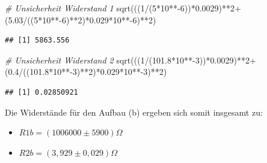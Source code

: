 \documentclass[
  9pt,
]{article}
\newenvironment{Shaded}{\begin{snugshade}}{\end{snugshade}}
\newcommand{\CommentTok}[1]{\textcolor[rgb]{0.56,0.35,0.01}{\textit{#1}}}
\newcommand{\DecValTok}[1]{\textcolor[rgb]{0.00,0.00,0.81}{#1}}
\newcommand{\FloatTok}[1]{\textcolor[rgb]{0.00,0.00,0.81}{#1}}
\newcommand{\FunctionTok}[1]{\textcolor[rgb]{0.00,0.00,0.00}{#1}}
\newcommand{\NormalTok}[1]{#1}
\newcommand{\SpecialCharTok}[1]{\textcolor[rgb]{0.00,0.00,0.00}{#1}}
\begin{document}
\begin{Shaded}
\begin{Highlighting}[]
\CommentTok{\# Unsicherheit Widerstand 1}
\FunctionTok{sqrt}\NormalTok{(((}\DecValTok{1}\SpecialCharTok{/}\NormalTok{(}\DecValTok{5}\SpecialCharTok{*}\DecValTok{10}\SpecialCharTok{**{-}}\DecValTok{6}\NormalTok{))}\SpecialCharTok{*}\FloatTok{0.0029}\NormalTok{)}\SpecialCharTok{**}\DecValTok{2}\SpecialCharTok{+}\NormalTok{(}\FloatTok{5.03}\SpecialCharTok{/}\NormalTok{((}\DecValTok{5}\SpecialCharTok{*}\DecValTok{10}\SpecialCharTok{**{-}}\DecValTok{6}\NormalTok{)}\SpecialCharTok{**}\DecValTok{2}\NormalTok{)}\SpecialCharTok{*}\FloatTok{0.029}\SpecialCharTok{*}\DecValTok{10}\SpecialCharTok{**{-}}\DecValTok{6}\NormalTok{)}\SpecialCharTok{**}\DecValTok{2}\NormalTok{)}
\end{Highlighting}
\end{Shaded}

\begin{verbatim}
## [1] 5863.556
\end{verbatim}

\begin{Shaded}
\begin{Highlighting}[]
\CommentTok{\# Unsicherheit Widerstand 2}
\FunctionTok{sqrt}\NormalTok{(((}\DecValTok{1}\SpecialCharTok{/}\NormalTok{(}\FloatTok{101.8}\SpecialCharTok{*}\DecValTok{10}\SpecialCharTok{**{-}}\DecValTok{3}\NormalTok{))}\SpecialCharTok{*}\FloatTok{0.0029}\NormalTok{)}\SpecialCharTok{**}\DecValTok{2}\SpecialCharTok{+}\NormalTok{(}\FloatTok{0.4}\SpecialCharTok{/}\NormalTok{((}\FloatTok{101.8}\SpecialCharTok{*}\DecValTok{10}\SpecialCharTok{**{-}}\DecValTok{3}\NormalTok{)}\SpecialCharTok{**}\DecValTok{2}\NormalTok{)}\SpecialCharTok{*}\FloatTok{0.029}\SpecialCharTok{*}\DecValTok{10}\SpecialCharTok{**{-}}\DecValTok{3}\NormalTok{)}\SpecialCharTok{**}\DecValTok{2}\NormalTok{)}
\end{Highlighting}
\end{Shaded}

\begin{verbatim}
## [1] 0.02850921
\end{verbatim}

Die Widerstände für den Aufbau (b) ergeben sich somit insgesamt zu:

\begin{itemize}
\item $R1b = (1006000\pm 5900)\Omega $
\item $R2b = (3,929\pm 0,029) \Omega$
\end{itemize}
\end{document}
